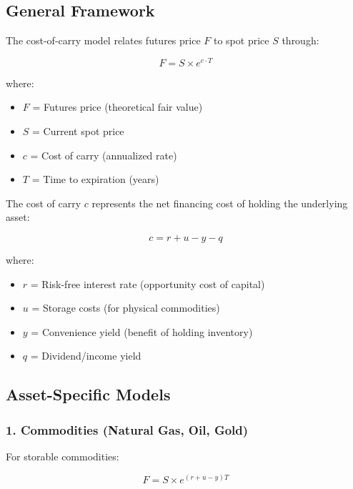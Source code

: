 \documentclass[12pt,a4paper]{article}
\begin{document}
\subsection{General Framework}

The cost-of-carry model relates futures price $F$ to spot price $S$ through:

\begin{equation}
F = S \times e^{c \cdot T}
\end{equation}

where:
\begin{itemize}
    \item $F$ = Futures price (theoretical fair value)
    \item $S$ = Current spot price
    \item $c$ = Cost of carry (annualized rate)
    \item $T$ = Time to expiration (years)
\end{itemize}

The cost of carry $c$ represents the net financing cost of holding the underlying asset:

\begin{equation}
c = r + u - y - q
\end{equation}

where:
\begin{itemize}
    \item $r$ = Risk-free interest rate (opportunity cost of capital)
    \item $u$ = Storage costs (for physical commodities)
    \item $y$ = Convenience yield (benefit of holding inventory)
    \item $q$ = Dividend/income yield
\end{itemize}

\subsection{Asset-Specific Models}

\subsubsection{1. Commodities (Natural Gas, Oil, Gold)}

For storable commodities:

\begin{equation}
F = S \times e^{(r + u - y)T}
\end{equation}
\end{document}
